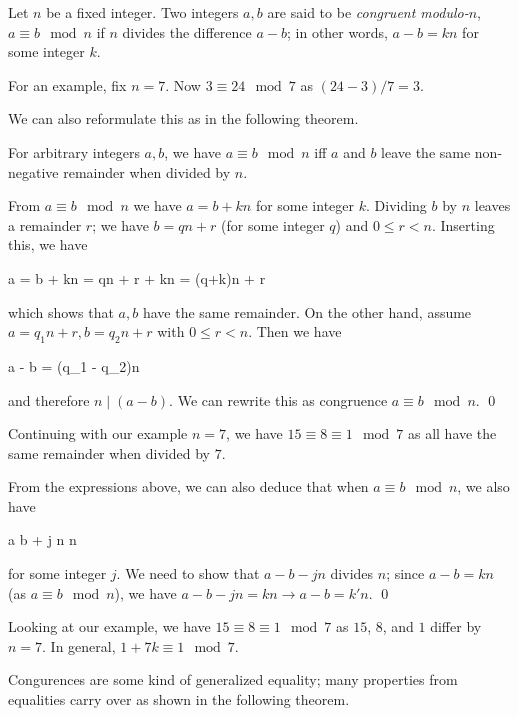 
\begin{definition}
    Let $n$ be a fixed integer. Two integers $a, b$ are said to be \emph{congruent modulo-$n$}, $a \equiv b \mod n$ if $n$ divides the difference $a - b$; in other words, $a - b = kn$ for some integer $k$.
\end{definition}

For an example, fix $n = 7$. Now $3 \equiv 24 \mod 7$ as $(24-3) / 7 = 3$.

We can also reformulate this as in the following theorem.

\begin{theorem}
    For arbitrary integers $a, b$, we have $a \equiv b \mod n$ iff $a$ and $b$ leave the same non-negative remainder when divided by $n$.
\end{theorem}

From $a \equiv b \mod n$ we have $a = b + kn$ for some integer $k$. Dividing $b$ by $n$ leaves a remainder $r$; we have $b = qn + r$ (for some integer $q$) and $0 \leq r < n$. Inserting this, we have

\bee
a = b + kn = qn + r + kn = (q+k)n + r
\eee

which shows that $a, b$ have the same remainder. On the other hand, assume $a = q_1 n + r, b = q_2 n + r$ with $0 \leq r < n$. Then we have

\bee
a - b = (q_1 - q_2)n
\eee

and therefore $n \mid (a-b)$. We can rewrite this as congruence $a \equiv b \mod n$. \qed

Continuing with our example $n = 7$, we have $15 \equiv 8 \equiv 1 \mod 7$ as all have the same remainder when divided by $7$.

From the expressions above, we can also deduce that when $a \equiv b \mod n$, we also have 

\bee
a \equiv b + j n \mod n
\eee

for some integer $j$. We need to show that $a - b - jn$ divides $n$; since $a - b = kn$ (as $a \equiv b \mod n$), we have $a - b - jn = kn \rightarrow a - b = k'n$. \qed 

Looking at our example, we have $15 \equiv 8 \equiv 1 \mod 7$ as $15$, $8$, and $1$ differ by $n = 7$. In general, $1 + 7 k \equiv 1 \mod 7$.

Congurences are some kind of generalized equality; many properties from equalities carry over as shown in the following theorem.

